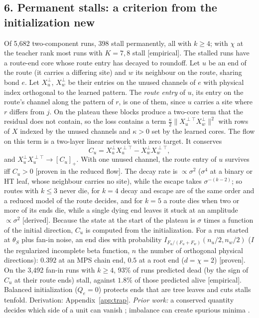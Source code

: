 \documentclass[11pt]{article}
\newcommand{\NEW}{\colorbox{ForestGreen!22}{\textsf{\small new}}}
\newcommand{\ev}[1]{\textsf{\small[#1]}}
\begin{document}
\subsection*{6. Permanent stalls: a criterion from the initialization \hfill\NEW}
Of 5,682 two-component runs, 398 stall permanently, all with $k\ge4$; with $\chi$ at the teacher rank most
runs with $K=7,8$ stall \ev{empirical}. The stalled runs have a route-end core whose route entry has decayed
to roundoff. Let $u$ be an end of the route (it carries a differing site) and $w$ its neighbour on the
route, sharing bond $e$. Let $X_u^\perp$, $X_w^\perp$ be their entries on the unused channels of $e$ with
physical index orthogonal to the learned pattern. The \emph{route entry} of $u$, its entry on the route's
channel along the pattern of $r$, is one of them, since $u$ carries a site where $r$ differs from $j$. On the plateau
these blocks produce a two-core term that the residual does not contain, so the loss contains a term
$\tfrac\kappa2\lVert X_u^{\perp\top}X_w^\perp\rVert^2$ with rows of $X$ indexed by the unused channels and $\kappa>0$ set by the learned cores. The flow on this
term is a two-layer linear network with zero target. It conserves
\begin{equation}
C_u=X_u^\perp X_u^{\perp\top}-X_w^\perp X_w^{\perp\top},
\end{equation}
and $X_u^\perp X_u^{\perp\top}\to[C_u]_+$. With one unused channel, the route entry of $u$ survives iff
$C_u>0$ \ev{proven in the reduced flow}. The decay rate is $\propto\sigma^2$ ($\sigma^4$ at a binary or HT
leaf, whose neighbour carries no site), while the escape takes $\sigma^{-(k-2)}$; so routes with $k\le3$
never die, for $k=4$ decay and escape are of the same order and a reduced model of the route decides, and
for $k=5$ a route dies when two or more of its ends die, while a single dying end leaves it stuck at an
amplitude $\propto\sigma^{2}$ \ev{derived}. Because the state at
the start of the plateau is $\sigma$ times a function of the initial direction, $C_u$ is computed from
the initialization. For a run started at $\theta_S$ plus fan-in noise, an end dies with probability
$I_{F_u/(F_u+F_w)}(n_u/2,n_w/2)$ ($I$ the regularized incomplete beta function, $n$ the number of orthogonal
physical directions): $0.392$ at an MPS chain end, $0.5$ at a root end ($d=\chi=2$) \ev{proven}. On the 3,492
fan-in runs with $k\ge4$, $93\%$ of runs predicted dead (by the sign of $C_u$ at their route ends) stall, against $1.8\%$ of those predicted alive
\ev{empirical}. Balanced initialization ($Q_e=0$) protects ends that are tree leaves and cuts stalls tenfold.
Derivation: Appendix~\ref{app:trap}.
\emph{Prior work:} a conserved quantity decides which side of a unit can vanish
\citep[Lemma~B.1]{kunin2025alternating}; imbalance can create spurious minima \citep[Thm~G.1]{furman2026benign}.
\end{document}
